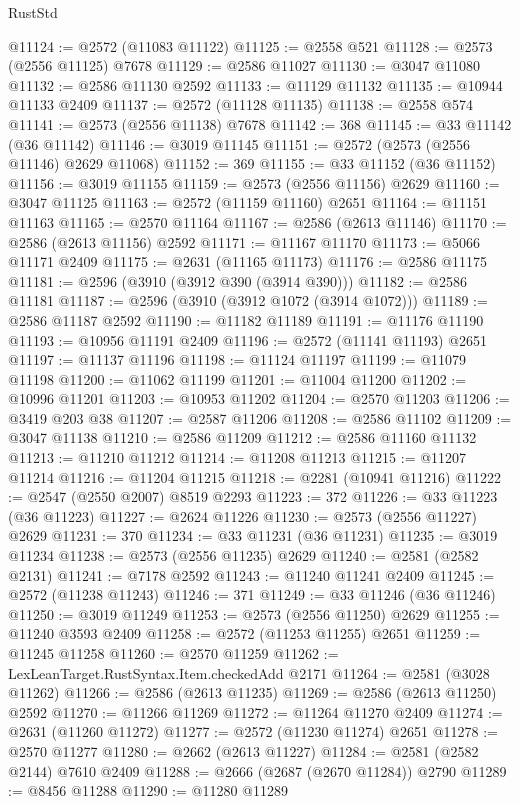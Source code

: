 \begin{lexlean}{RustStd}
\begin{coremodule}
@11124 := @2572 (@11083 @11122)
@11125 := @2558 @521
@11128 := @2573 (@2556 @11125) @7678
@11129 := @2586 @11027
@11130 := @3047 @11080
@11132 := @2586 @11130 @2592
@11133 := @11129 @11132
@11135 := @10944 @11133 @2409
@11137 := @2572 (@11128 @11135)
@11138 := @2558 @574
@11141 := @2573 (@2556 @11138) @7678
@11142 := 368
@11145 := @33 @11142 (@36 @11142)
@11146 := @3019 @11145
@11151 := @2572 (@2573 (@2556 @11146) @2629 @11068)
@11152 := 369
@11155 := @33 @11152 (@36 @11152)
@11156 := @3019 @11155
@11159 := @2573 (@2556 @11156) @2629
@11160 := @3047 @11125
@11163 := @2572 (@11159 @11160) @2651
@11164 := @11151 @11163
@11165 := @2570 @11164
@11167 := @2586 (@2613 @11146)
@11170 := @2586 (@2613 @11156) @2592
@11171 := @11167 @11170
@11173 := @5066 @11171 @2409
@11175 := @2631 (@11165 @11173)
@11176 := @2586 @11175
@11181 := @2596 (@3910 (@3912 @390 (@3914 @390)))
@11182 := @2586 @11181
@11187 := @2596 (@3910 (@3912 @1072 (@3914 @1072)))
@11189 := @2586 @11187 @2592
@11190 := @11182 @11189
@11191 := @11176 @11190
@11193 := @10956 @11191 @2409
@11196 := @2572 (@11141 @11193) @2651
@11197 := @11137 @11196
@11198 := @11124 @11197
@11199 := @11079 @11198
@11200 := @11062 @11199
@11201 := @11004 @11200
@11202 := @10996 @11201
@11203 := @10953 @11202
@11204 := @2570 @11203
@11206 := @3419 @203 @38
@11207 := @2587 @11206
@11208 := @2586 @11102
@11209 := @3047 @11138
@11210 := @2586 @11209
@11212 := @2586 @11160 @11132
@11213 := @11210 @11212
@11214 := @11208 @11213
@11215 := @11207 @11214
@11216 := @11204 @11215
@11218 := @2281 (@10941 @11216)
@11222 := @2547 (@2550 @2007) @8519 @2293
@11223 := 372
@11226 := @33 @11223 (@36 @11223)
@11227 := @2624 @11226
@11230 := @2573 (@2556 @11227) @2629
@11231 := 370
@11234 := @33 @11231 (@36 @11231)
@11235 := @3019 @11234
@11238 := @2573 (@2556 @11235) @2629
@11240 := @2581 (@2582 @2131)
@11241 := @7178 @2592
@11243 := @11240 @11241 @2409
@11245 := @2572 (@11238 @11243)
@11246 := 371
@11249 := @33 @11246 (@36 @11246)
@11250 := @3019 @11249
@11253 := @2573 (@2556 @11250) @2629
@11255 := @11240 @3593 @2409
@11258 := @2572 (@11253 @11255) @2651
@11259 := @11245 @11258
@11260 := @2570 @11259
@11262 := LexLeanTarget.RustSyntax.Item.checkedAdd @2171
@11264 := @2581 (@3028 @11262)
@11266 := @2586 (@2613 @11235)
@11269 := @2586 (@2613 @11250) @2592
@11270 := @11266 @11269
@11272 := @11264 @11270 @2409
@11274 := @2631 (@11260 @11272)
@11277 := @2572 (@11230 @11274) @2651
@11278 := @2570 @11277
@11280 := @2662 (@2613 @11227)
@11284 := @2581 (@2582 @2144) @7610 @2409
@11288 := @2666 (@2687 (@2670 @11284)) @2790
@11289 := @8456 @11288
@11290 := @11280 @11289

\end{coremodule}
\end{lexlean}
